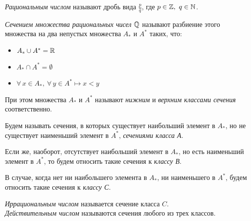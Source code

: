 \setcounter{section}{0}



\begin{definition}
    \textit{Рациональным числом} называют дробь вида \(\frac{p}{q}\), где \(p\in\mathbb{Z},~q\in\mathbb{N}\). 
\end{definition}

\begin{definition}
    \textit{Сечением множества рациональных чисел \(\mathbb{Q}\)} называют
    разбиение этого множества на два непустых множества \(A_{*}\) и \(A^{*}\) таких, что:
    \begin{itemize}
        \item \(A_{*}\cup A^{*}=\mathbb{R}\) 
        \item \(A_{*}\cap A^{*}=\emptyset\)
        \item \(\forall\, x\in A_{*},~\forall\,y\in A^{*}\longmapsto x < y\)
    \end{itemize}
    При этом множества \(A_{*}\) и \(A^{*}\) называют
    \textit{нижним} и \textit{верхним классами сечения} соответственно. 
\end{definition}

\begin{notation}
    Будем называть сечения, в которых существует наибольший элемент в \(A_{*}\), 
    но не существует наименьший элемент в \(A^{*}\), \textit{сечениями класса А}.

    \vspace{2mm}

    Если же, наоборот, отсутствует наибольший элемент в \(A_{*}\), но есть наименьший
     элемент в \(A^{*}\), то будем относить такие сечения к \textit{классу В}.

     \vspace{2mm}

    В случае, когда нет ни наибольшего элемента в \(A_{*}\), ни наименьшего в \(A^{*}\),
    будем относить такие сечения к \textit{классу С}.
\end{notation}

\begin{definition}
    \textit{Иррациональным числом} называется сечение класса \(C\). \\
    \textit{Действительным числом} называются сечения любого из трех классов.
\end{definition}

